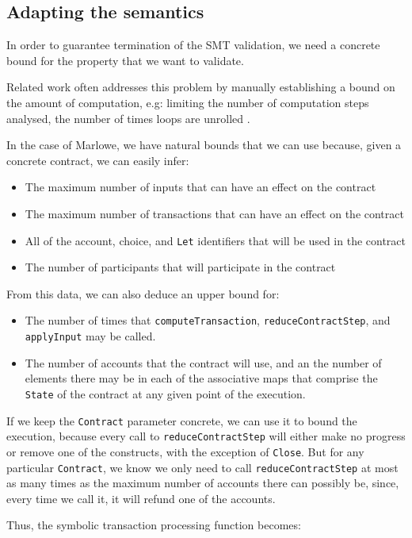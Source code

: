 \documentclass[english,runningheads]{llncs}
\begin{document}
\subsection{Adapting the semantics\label{subsec:Adapting-the-semantics}}

In order to guarantee termination of the SMT validation, we need a
concrete bound for the property that we want to validate.

Related work often addresses this problem by manually establishing
a bound on the amount of computation, e.g: limiting the number of
computation steps analysed, the number of times loops are unrolled
\cite{clarke2004tool,gulwani2008program,jackson2000finding}.

In the case of Marlowe, we have natural bounds that we can use because,
given a concrete contract, we can easily infer:
\begin{itemize}
\item The maximum number of inputs that can have an effect on the contract
\item The maximum number of transactions that can have an effect on the
contract
\item All of the account, choice, and \texttt{Let} identifiers that will
be used in the contract
\item The number of participants that will participate in the contract
\end{itemize}
From this data, we can also deduce an upper bound for:
\begin{itemize}
\item The number of times that
\texttt{computeTransaction}, \texttt{reduceContractStep}, and \texttt{applyInput} may
be called.
\item The number of accounts that the contract will use, and an
the number of elements there may be in each of the associative maps
that comprise the \texttt{State} of the contract at any given point
of the execution.
\end{itemize}
If we keep the \texttt{Contract} parameter concrete,
we can use it to bound the execution, because every call to \texttt{reduceContractStep}
will either make no progress or remove one of the constructs, with
the exception of \texttt{Close}. But for any particular \texttt{Contract},
we know we only need to call \texttt{reduceContractStep} at most as many times as
the maximum number of accounts there can possibly be, since, every time we call
it, it will refund one of the accounts.

Thus, the symbolic transaction processing function becomes:
\end{document}
